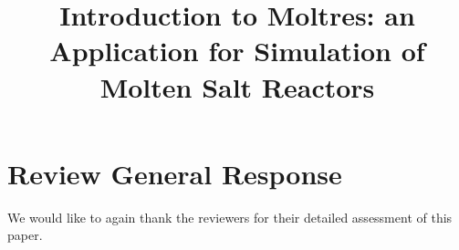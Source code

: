 \documentclass[answers,11pt]{exam}
\begin{document}



\title{Introduction to Moltres: an Application for Simulation of Molten Salt
        Reactors}



%

\section*{Review General Response}
We would like to again thank the reviewers for their detailed assessment of
this paper.
\end{document}
